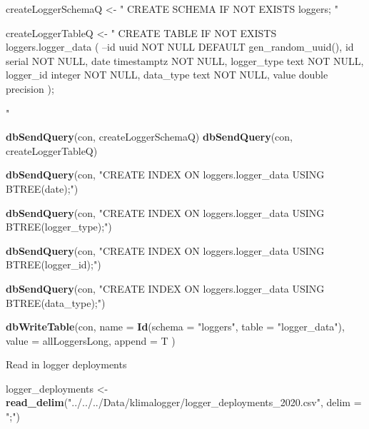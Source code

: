 \documentclass[]{article}
\newenvironment{Shaded}{\begin{snugshade}}{\end{snugshade}}
\newcommand{\DataTypeTok}[1]{\textcolor[rgb]{0.13,0.29,0.53}{#1}}
\newcommand{\KeywordTok}[1]{\textcolor[rgb]{0.13,0.29,0.53}{\textbf{#1}}}
\newcommand{\NormalTok}[1]{#1}
\newcommand{\StringTok}[1]{\textcolor[rgb]{0.31,0.60,0.02}{#1}}
\begin{document}
\begin{Shaded}
\begin{Highlighting}[]
\NormalTok{createLoggerSchemaQ <-}\StringTok{ "}
\StringTok{CREATE SCHEMA IF NOT EXISTS loggers;}
\StringTok{"}

\NormalTok{createLoggerTableQ <-}\StringTok{ "}
\StringTok{CREATE TABLE IF NOT EXISTS loggers.logger_data (}
\StringTok{--id uuid NOT NULL DEFAULT gen_random_uuid(),}
\StringTok{id serial NOT NULL,}
\StringTok{date timestamptz NOT NULL,}
\StringTok{logger_type text NOT NULL,}
\StringTok{logger_id integer NOT NULL,}
\StringTok{data_type text NOT NULL,}
\StringTok{value double precision}
\StringTok{);}

\StringTok{"}

\KeywordTok{dbSendQuery}\NormalTok{(con, createLoggerSchemaQ)}
\KeywordTok{dbSendQuery}\NormalTok{(con, createLoggerTableQ)}

\KeywordTok{dbSendQuery}\NormalTok{(con,}
            \StringTok{"CREATE INDEX ON loggers.logger_data USING BTREE(date);"}\NormalTok{)}

\KeywordTok{dbSendQuery}\NormalTok{(con,}
            \StringTok{"CREATE INDEX ON loggers.logger_data USING BTREE(logger_type);"}\NormalTok{)}

\KeywordTok{dbSendQuery}\NormalTok{(con,}
            \StringTok{"CREATE INDEX ON loggers.logger_data USING BTREE(logger_id);"}\NormalTok{)}

\KeywordTok{dbSendQuery}\NormalTok{(con,}
            \StringTok{"CREATE INDEX ON loggers.logger_data USING BTREE(data_type);"}\NormalTok{)}
\end{Highlighting}
\end{Shaded}

\begin{Shaded}
\begin{Highlighting}[]
\KeywordTok{dbWriteTable}\NormalTok{(con, }
             \DataTypeTok{name =} \KeywordTok{Id}\NormalTok{(}\DataTypeTok{schema =} \StringTok{"loggers"}\NormalTok{, }\DataTypeTok{table =} \StringTok{"logger_data"}\NormalTok{),}
             \DataTypeTok{value =}\NormalTok{ allLoggersLong,}
             \DataTypeTok{append =}\NormalTok{ T}
\NormalTok{             )}
\end{Highlighting}
\end{Shaded}

Read in logger deployments

\begin{Shaded}
\begin{Highlighting}[]
\NormalTok{logger_deployments <-}\StringTok{ }\KeywordTok{read_delim}\NormalTok{(}\StringTok{"../../../Data/klimalogger/logger_deployments_2020.csv"}\NormalTok{,}
                               \DataTypeTok{delim =} \StringTok{";"}\NormalTok{)}
\end{Highlighting}
\end{Shaded}
\end{document}
